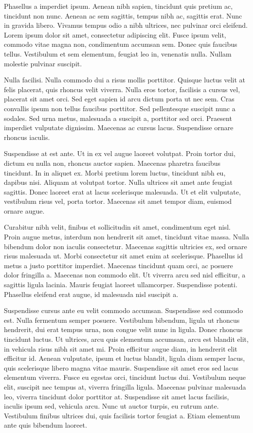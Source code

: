 Phasellus a imperdiet ipsum. Aenean nibh sapien, tincidunt quis pretium ac, tincidunt non nunc. Aenean ac sem sagittis, tempus nibh ac, sagittis erat. Nunc in gravida libero. Vivamus tempus odio a nibh ultrices, nec pulvinar orci eleifend. Lorem ipsum dolor sit amet, consectetur adipiscing elit. Fusce ipsum velit, commodo vitae magna non, condimentum accumsan sem. Donec quis faucibus tellus. Vestibulum et sem elementum, feugiat leo in, venenatis nulla. Nullam molestie pulvinar suscipit.

Nulla facilisi. Nulla commodo dui a risus mollis porttitor. Quisque luctus velit at felis placerat, quis rhoncus velit viverra. Nulla eros tortor, facilisis a cursus vel, placerat sit amet orci. Sed eget sapien id arcu dictum porta ut nec sem. Cras convallis ipsum non tellus faucibus porttitor. Sed pellentesque suscipit nunc a sodales. Sed urna metus, malesuada a suscipit a, porttitor sed orci. Praesent imperdiet vulputate dignissim. Maecenas ac cursus lacus. Suspendisse ornare rhoncus iaculis.

Suspendisse at est ante. Ut in ex vel augue laoreet volutpat. Proin tortor dui, dictum eu nulla non, rhoncus auctor sapien. Maecenas pharetra faucibus tincidunt. In in aliquet ex. Morbi pretium lorem luctus, tincidunt nibh eu, dapibus nisi. Aliquam at volutpat tortor. Nulla ultrices sit amet ante feugiat sagittis. Donec laoreet erat at lacus scelerisque malesuada. Ut et elit vulputate, vestibulum risus vel, porta tortor. Maecenas sit amet tempor diam, euismod ornare augue.

Curabitur nibh velit, finibus et sollicitudin sit amet, condimentum eget nisl. Proin augue metus, interdum non hendrerit sit amet, tincidunt vitae massa. Nulla bibendum dolor non iaculis consectetur. Maecenas sagittis ultricies ex, sed ornare risus malesuada ut. Morbi consectetur sit amet enim at scelerisque. Phasellus id metus a justo porttitor imperdiet. Maecenas tincidunt quam orci, ac posuere dolor fringilla a. Maecenas non commodo elit. Ut viverra arcu sed nisl efficitur, a sagittis ligula lacinia. Mauris feugiat laoreet ullamcorper. Suspendisse potenti. Phasellus eleifend erat augue, id malesuada nisl suscipit a.

Suspendisse cursus ante eu velit commodo accumsan. Suspendisse sed commodo est. Nulla fermentum semper posuere. Vestibulum bibendum, ligula ut rhoncus hendrerit, dui erat tempus urna, non congue velit nunc in ligula. Donec rhoncus tincidunt luctus. Ut ultrices, arcu quis elementum accumsan, arcu est blandit elit, in vehicula risus nibh sit amet mi. Proin efficitur augue diam, in hendrerit elit efficitur id. Aenean vulputate, ipsum et luctus blandit, ligula diam semper lacus, quis scelerisque libero magna vitae mauris. Suspendisse sit amet eros sed lacus elementum viverra. Fusce eu egestas orci, tincidunt luctus dui. Vestibulum neque elit, suscipit nec tempus at, viverra fringilla ligula. Maecenas pulvinar malesuada leo, viverra tincidunt dolor porttitor at. Suspendisse sit amet lacus facilisis, iaculis ipsum sed, vehicula arcu. Nunc ut auctor turpis, eu rutrum ante. Vestibulum finibus ultrices dui, quis facilisis tortor feugiat a. Etiam elementum ante quis bibendum laoreet.

